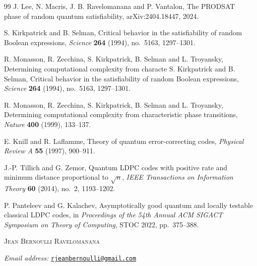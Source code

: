 \documentclass[11pt]{article}
\begin{document}
\begin{thebibliography}{99}
J. Lee, N. Macris, J. B. Ravelomanana and P. Vantalon,
The PRODSAT phase of random quantum satisfiability,
arXiv:2404.18447, 2024.

S. Kirkpatrick and B. Selman,
Critical behavior in the satisfiability of random Boolean expressions,
\emph{Science} \textbf{264} (1994), no.~5163, 1297--1301.

R. Monasson, R. Zecchina, S. Kirkpatrick, B. Selman and L. Troyansky,
Determining computational complexity from characte
S. Kirkpatrick and B. Selman,
Critical behavior in the satisfiability of random Boolean expressions,
\emph{Science} \textbf{264} (1994), no.~5163, 1297--1301.

R. Monasson, R. Zecchina, S. Kirkpatrick, B. Selman and L. Troyansky,
Determining computational complexity from characteristic phase transitions,
\emph{Nature} \textbf{400} (1999), 133--137.

E. Knill and R. Laflamme,
Theory of quantum error-correcting codes,
\emph{Physical Review A} \textbf{55} (1997), 900--911.

J.-P. Tillich and G. Zemor,
Quantum LDPC codes with positive rate and minimum distance proportional to
\(\sqrt n\),
\emph{IEEE Transactions on Information Theory} \textbf{60} (2014),
no.~2, 1193--1202.

P. Panteleev and G. Kalachev,
Asymptotically good quantum and locally testable classical LDPC codes,
in \emph{Proceedings of the 54th Annual ACM SIGACT Symposium on Theory of
Computing}, STOC 2022, pp.~375--388.

\end{thebibliography}
\bigskip

\noindent\textsc{Jean Bernoulli Ravelomanana}

\noindent\emph{Email address:}
\href{mailto:rjeanbernoulli@gmail.com}{\texttt{rjeanbernoulli@gmail.com}}
\end{document}
